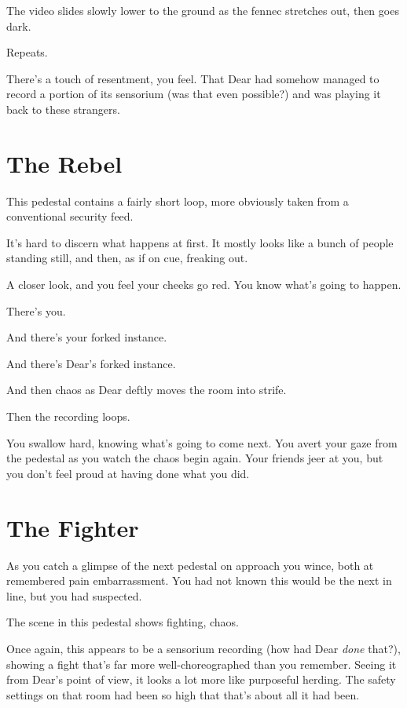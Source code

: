 The video slides slowly lower to the ground as the fennec stretches out, then goes dark.

Repeats.

There's a touch of resentment, you feel. That Dear had somehow managed to record a portion of its sensorium (was that even possible?) and was playing it back to these strangers.

\newpage
\section*{The Rebel}

This pedestal contains a fairly short loop, more obviously taken from a conventional security feed.

It's hard to discern what happens at first. It mostly looks like a bunch of people standing still, and then, as if on cue, freaking out.

A closer look, and you feel your cheeks go red. You know what's going to happen.

There's you.

And there's your forked instance.

And there's Dear's forked instance.

And then chaos as Dear deftly moves the room into strife.

Then the recording loops.

You swallow hard, knowing what's going to come next. You avert your gaze from the pedestal as you watch the chaos begin again. Your friends jeer at you, but you don't feel proud at having done what you did.

\newpage
\section*{The Fighter}

As you catch a glimpse of the next pedestal on approach you wince, both at remembered pain embarrassment. You had not known this would be the next in line, but you had suspected.

The scene in this pedestal shows fighting, chaos.

Once again, this appears to be a sensorium recording (how had Dear \emph{done} that?), showing a fight that's far more well-choreographed than you remember. Seeing it from Dear's point of view, it looks a lot more like purposeful herding. The safety settings on that room had been so high that that's about all it had been.

